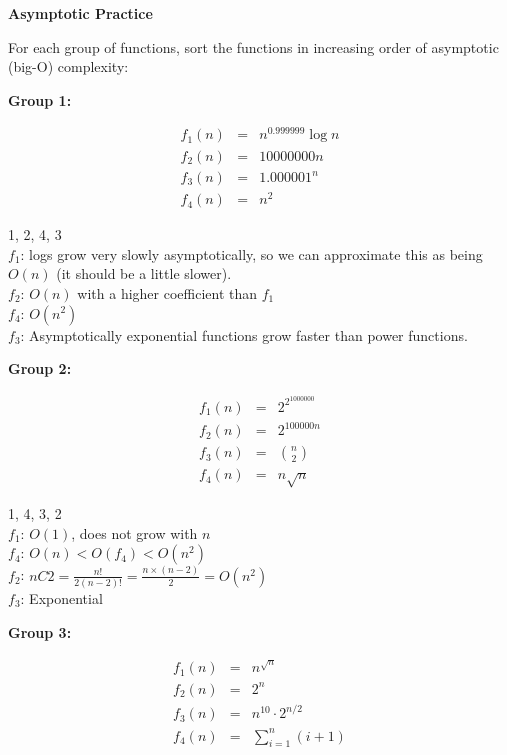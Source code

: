 \documentclass[12pt,twoside]{article}
\begin{document}
\begin{problems}

\problem {} \textbf{Asymptotic Practice}

For each group of functions, sort the functions in increasing order of
asymptotic (big-O) complexity:

\begin{problemparts}

\problempart {} \textbf{Group 1:}

$$
\begin{array}{rcl}
f_1(n) &=& n^{0.999999} \log n \\
f_2(n) &=& 10000000 n \\
f_3(n) &=& 1.000001^n \\
f_4(n) &=& n^2
\end{array}
$$

\ifsolution \solution{}
1, 2, 4, 3
\\$f_1$: logs grow very slowly asymptotically, so we can approximate this as being $O(n)$ (it should be a little slower).
\\$f_2$: $O(n)$ with a higher coefficient than $f_1$
\\$f_4$: $O(n^2)$
\\$f_3$: Asymptotically exponential functions grow faster than power functions.
\fi

\problempart {} \textbf{Group 2:}

$$
\begin{array}{rcl}
f_1(n) &=& 2^{2^{1000000}} \\
f_2(n) &=& 2^{100000n} \\
f_3(n) &=& \displaystyle \binom{n}{2} \\
f_4(n) &=& n \sqrt{n}
\end{array}
$$

\ifsolution \solution{}
1, 4, 3, 2
\\$f_1$: $O(1)$, does not grow with $n$
\\$f_4$: $O(n)<O(f_4)<O(n^2)$
\\$f_2$: $nC2 = \frac{n!}{2(n-2)!} = \frac{n\times(n-2)}{2} = O(n^2)$
\\$f_3$: Exponential
\fi

\problempart {} \textbf{Group 3:}

$$
\begin{array}{rcl}
f_1(n) &=& n^{\sqrt{n}} \\
f_2(n) &=& 2^n \\
f_3(n) &=& n^{10} \cdot 2^{n / 2} \\
f_4(n) &=& \displaystyle\sum_{i = 1}^{n} (i + 1)
\end{array}
$$


\end{problemparts}
\end{problems}
\end{document}
